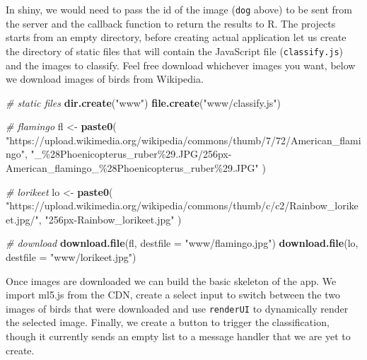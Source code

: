 \documentclass[
]{krantz}
\makeatletter
\newenvironment{Shaded}{\begin{snugshade}}{\end{snugshade}}
\newcommand{\CommentTok}[1]{\textcolor[rgb]{0.37,0.37,0.37}{\textit{#1}}}
\newcommand{\DataTypeTok}[1]{\textcolor[rgb]{0.27,0.27,0.27}{#1}}
\newcommand{\KeywordTok}[1]{\textcolor[rgb]{0.27,0.27,0.27}{\textbf{#1}}}
\newcommand{\NormalTok}[1]{#1}
\newcommand{\StringTok}[1]{\textcolor[rgb]{0.5,0.5,0.5}{#1}}
\newenvironment{kframe}{%
\medskip{}
\setlength{\fboxsep}{.8em}
 \def\at@end@of@kframe{}%
 \ifinner\ifhmode%
  \def\at@end@of@kframe{\end{minipage}}%
  \begin{minipage}{\columnwidth}%
 \fi\fi%
 \def\FrameCommand##1{\hskip\@totalleftmargin \hskip-\fboxsep
 \colorbox{shadecolor}{##1}\hskip-\fboxsep
     \hskip-\linewidth \hskip-\@totalleftmargin \hskip\columnwidth}%
 \MakeFramed {\advance\hsize-\width
   \@totalleftmargin\z@ \linewidth\hsize
   \@setminipage}}%
 {\par\unskip\endMakeFramed%
 \at@end@of@kframe}
\renewenvironment{Shaded}{\begin{kframe}}{\end{kframe}}
\makeatother
\begin{document}
In shiny, we would need to pass the id of the image (\texttt{dog} above) to be sent from the server and the callback function to return the results to R. The projects starts from an empty directory, before creating actual application let us create the directory of static files that will contain the JavaScript file (\texttt{classify.js}) and the images to classify. Feel free download whichever images you want, below we download images of birds from Wikipedia.

\begin{Shaded}
\begin{Highlighting}[]
\CommentTok{\# static files}
\KeywordTok{dir.create}\NormalTok{(}\StringTok{"www"}\NormalTok{)}
\KeywordTok{file.create}\NormalTok{(}\StringTok{"www/classify.js"}\NormalTok{)}

\CommentTok{\# flamingo}
\NormalTok{fl <{-}}\StringTok{ }\KeywordTok{paste0}\NormalTok{(}
  \StringTok{"https://upload.wikimedia.org/wikipedia/commons/thumb/7/72/American\_flamingo"}\NormalTok{,}
  \StringTok{"\_\%28Phoenicopterus\_ruber\%29.JPG/256px{-}American\_flamingo\_\%28Phoenicopterus\_ruber\%29.JPG"}
\NormalTok{)}

\CommentTok{\# lorikeet}
\NormalTok{lo <{-}}\StringTok{ }\KeywordTok{paste0}\NormalTok{(}
  \StringTok{"https://upload.wikimedia.org/wikipedia/commons/thumb/c/c2/Rainbow\_lorikeet.jpg/"}\NormalTok{,}
  \StringTok{"256px{-}Rainbow\_lorikeet.jpg"}
\NormalTok{)}

\CommentTok{\# download}
\KeywordTok{download.file}\NormalTok{(fl, }\DataTypeTok{destfile =} \StringTok{"www/flamingo.jpg"}\NormalTok{)}
\KeywordTok{download.file}\NormalTok{(lo, }\DataTypeTok{destfile =} \StringTok{"www/lorikeet.jpg"}\NormalTok{)}
\end{Highlighting}
\end{Shaded}

Once images are downloaded we can build the basic skeleton of the app. We import ml5.js from the CDN, create a select input to switch between the two images of birds that were downloaded and use \texttt{renderUI} to dynamically render the selected image. Finally, we create a button to trigger the classification, though it currently sends an empty list to a message handler that we are yet to create.
\end{document}

